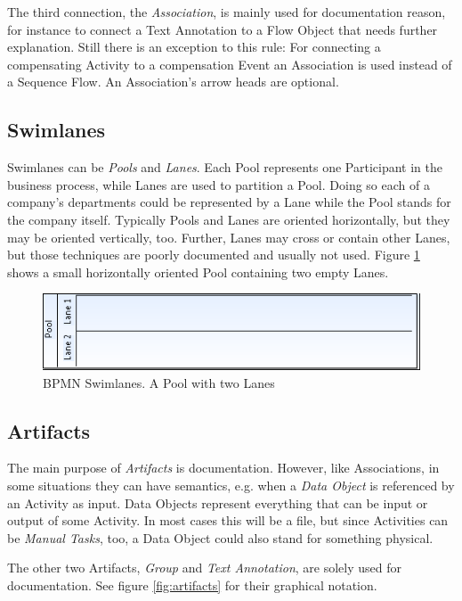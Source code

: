 The third connection, the \emph{Association}, is mainly used for documentation reason, for instance
to connect a Text Annotation to a Flow Object that needs further explanation. Still there is an
exception to this rule: For connecting a compensating Activity to a compensation Event an
Association is used instead of a Sequence Flow. An Association's arrow heads are optional.

\subsection{Swimlanes}

Swimlanes can be \emph{Pools} and \emph{Lanes}. Each Pool represents one Participant in the business
process, while Lanes are used to partition a Pool. Doing so each of a company's departments could be
represented by a Lane while the Pool stands for the company itself. Typically Pools and Lanes are
oriented horizontally, but they may be oriented vertically, too. Further, Lanes may cross or contain
other Lanes, but those techniques are poorly documented and usually not used. Figure
\ref{fig:swimlanes} shows a small horizontally oriented Pool containing two empty Lanes.

\begin{figure}[ht]
	\centering
	\includegraphics[width=.75\textwidth]{figures/bpmn/swimlanes.png}
	\caption[BPMN Swimlanes]{BPMN Swimlanes. A Pool with two Lanes}
	\label{fig:swimlanes}
\end{figure}

\subsection{Artifacts}

The main purpose of \emph{Artifacts} is documentation. However, like Associations, in some
situations they can have semantics, e.g. when a \emph{Data Object} is referenced by an Activity as
input. Data Objects represent everything that can be input or output of some Activity. In most cases
this will be a file, but since Activities can be \emph{Manual Tasks}, too, a Data Object could also
stand for something physical.

The other two Artifacts, \emph{Group} and \emph{Text Annotation}, are solely used for documentation.
See figure \ref{fig:artifacts} for their graphical notation.

